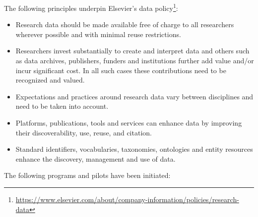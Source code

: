 \documentclass[a4paper,USenglish]{dagrep}
\begin{document}
\noindent The following principles underpin Elsevier's data policy\footnote{\url{https://www.elsevier.com/about/company-information/policies/research-data}}:
\begin{itemize}
\item Research data should be made available free of charge to all researchers wherever possible and with minimal reuse restrictions.
\item Researchers invest substantially to create and interpret data and others such as data archives, publishers, funders and institutions further add value and/or incur significant cost. In all such cases these contributions need to be recognized and valued.
\item Expectations and practices around research data vary between disciplines and need to be taken into account.
\item Platforms, publications, tools and services can enhance data by improving their discoverability, use, reuse, and citation.
\item Standard identifiers, vocabularies, taxonomies, ontologies and entity resources enhance the discovery, management and use of data.
\end{itemize}
\noindent The following programs and pilots have been initiated:
\end{document}
